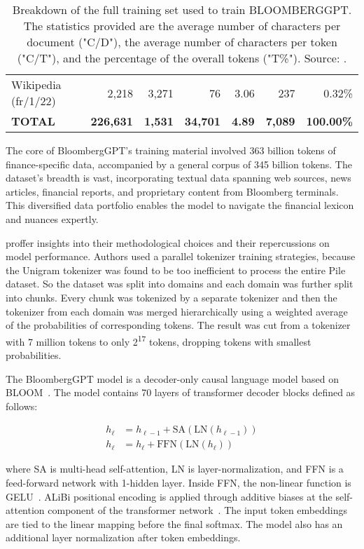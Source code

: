 \begin{table}[!h]
\begin{tabularx}{\textwidth}{lrrrrrr}
		Wikipedia (fr/1/22) & 2,218            & 3,271          & 76              & 3.06          & 237            & 0.32\%            \\
		\textbf{TOTAL}      & \textbf{226,631} & \textbf{1,531} & \textbf{34,701} & \textbf{4.89} & \textbf{7,089} & \textbf{100.00\%} \\
		\bottomrule
	\end{tabularx}
	\caption{Breakdown of the full training set used to train BLOOMBERGGPT. The statistics provided are the average number of characters per document ("C/D"), the average number of characters per token ("C/T"), and the percentage of the overall tokens ("T\%"). Source: \protect\textcite{wu2023bloomberggpt}.}
	\label{tab:training_set}
\end{table}

The core of BloombergGPT's training material involved 363 billion tokens of finance-specific data, accompanied by a general corpus of 345 billion tokens.
The dataset's breadth is vast, incorporating textual data spanning web sources, news articles, financial reports, and proprietary content from Bloomberg terminals.
This diversified data portfolio enables the model to navigate the financial lexicon and nuances expertly.

\textcite{wu2023bloomberggpt} proffer insights into their methodological choices and their repercussions on model performance.
Authors used a parallel tokenizer training strategies, because the Unigram tokenizer was found to be too inefficient to process the entire Pile dataset.
So the dataset was split into domains and each domain was further split into chunks.
Every chunk was tokenized by a separate tokenizer and then the tokenizer from each domain was merged hierarchically using a weighted average of the probabilities of corresponding tokens.
The result was cut from a tokenizer with 7 million tokens to only 2\textsuperscript{17} tokens, dropping tokens with smallest probabilities.

The BloombergGPT model is a decoder-only causal language model based on BLOOM~\cite{workshop2023bloom}.
The model contains 70 layers of transformer decoder blocks defined as follows:

\begin{align*}
	h_{\ell} & = h_{\ell-1} + \text{SA}(\text{LN}(h_{\ell-1})) \\
	h_{\ell} & = h_{\ell} + \text{FFN}(\text{LN}(h_{\ell}))
\end{align*}

where SA is multi-head self-attention, LN is layer-normalization, and FFN is a feed-forward network with 1-hidden layer.
Inside FFN, the non-linear function is GELU~\cite{hendrycks2016gelu}.
ALiBi positional encoding is applied through additive biases at the self-attention component of the transformer network~\cite{lescao2022milliongpuhours}. The input token embeddings are tied to the linear mapping before the final softmax.
The model also has an additional layer normalization after token embeddings.

